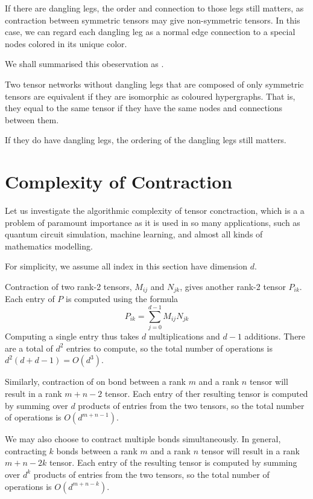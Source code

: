 If there are dangling legs, the order and connection to those legs still matters, as contraction between symmetric tensors may give non-symmetric tensors.
In this case, we can regard each dangling leg as a normal edge connection to a special nodes colored in its unique color.

We shall summarised this obeservation as .

\begin{lemma}
	Two tensor networks without dangling legs that are composed of only symmetric tensors are equivalent if they are isomorphic as coloured hypergraphs.
	That is, they equal to the same tensor if they have the same nodes and connections between them.

	If they do have dangling legs, the ordering of the dangling legs still matters. 
\end{lemma}\label{lem:only-connectivity-matters}

\section{Complexity of Contraction}

Let us investigate the algorithmic complexity of tensor conctraction, which is a a problem of paramount importance as it is used in so many applications, such as quantum circuit simulation, machine learning, and almost all kinds of mathematics modelling.

For simplicity, we assume all index in this section have dimension $d$.

Contraction of two rank-2 tensors, $M_{ij}$ and $N_{jk}$, gives another rank-2 tensor $P_{ik}$.
Each entry of $P$ is computed using the formula
$$
	P_{ik} = \sum_{j=0}^{d-1} M_{ij} N_{jk}	
$$
Computing a single entry thus takes $d$ multiplications and $d-1$ additions.
There are a total of $d^2$ entries to compute, so the total number of operations is $d^2(d + d - 1) = O(d^3)$.

Similarly, contraction of on bond between a rank $m$ and a rank $n$ tensor will result in a rank $m + n - 2$ tensor. 
Each entry of ther resulting tensor is computed by summing over $d$ products of entries from the two tensors, so the total number of operations is $O(d^{m+n-1})$.

We may also choose to contract multiple bonds simultaneously. 
In general, contracting $k$ bonds between a rank $m$ and a rank $n$ tensor will result in a rank $m + n - 2k$ tensor.
Each entry of the resulting tensor is computed by summing over $d^k$ products of entries from the two tensors, so the total number of operations is $O(d^{m+n-k})$.

